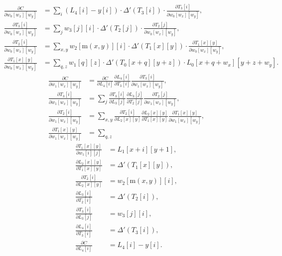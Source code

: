 \documentclass[12pt]{article}
\newcommand{\deriv}[2]{\frac{\partial #1}{\partial #2}}
\newcommand{\m}{\text{m}}
\begin{document}
\begin{align*}
	\deriv{C}{w_0[w_x][w_y]} &= \sum_{i} (L_4[i] - y[i]) \cdot \Delta '(T_3[i]) \cdot \deriv{T_3[i]}{w_0[w_x][w_y]}, \\
	\deriv{T_3[i]}{w_0[w_x][w_y]} &= \sum_{j} w_3[j][i] \cdot \Delta '(T_2[j]) \cdot \deriv{T_2[j]}{w_0[w_x][w_y]}, \\
	\deriv{T_2[i]}{w_0[w_x][w_y]} &= \sum_{x,y} w_2[\m (x,y)][i] \cdot \Delta '(T_1[x][y]) \cdot \deriv{T_1[x][y]}{w_0[w_x][w_y]}, \\
	\deriv{T_1[x][y]}{w_0[w_x][w_y]} &= \sum_{q,z} w_1[q][z] \cdot \Delta '(T_0[x+q][y+z]) \cdot L_0[x+q+w_x][y+z+w_y]. 
\end{align*}
\begin{align*}
	\deriv{C}{w_1[w_x][w_y]} &= \deriv{C}{L_4[i]} \deriv{L_4[i]}{T_3[i]} \deriv{T_3[i]}{w_1[w_x][w_y]}, \\
	\deriv{T_3[i]}{w_1[w_x][w_y]} &= \sum_{j} \deriv{T_3[i]}{L_3[j]} \deriv{L_3[j]}{T_2[j]} \deriv{T_2[j]}{w_1[w_x][w_y]}, \\
	\deriv{T_2[i]}{w_1[w_x][w_y]} &= \sum_{x,y} \deriv{T_2[i]}{L_2[x][y]} \deriv{L_2[x][y]}{T_1[x][y]} \deriv{T_1[x][y]}{w_1[w_x][w_y]}, \\
	\deriv{T_1[x][y]}{w_1[w_x][w_y]} &= \sum_{q,z}
\end{align*}
\begin{align*}
	\deriv{T_1[x][y]}{w_1[i][j]} &= L_1[x+i][y+1], \\
	\deriv{L_2[x][y]}{T_1[x][y]} &= \Delta '(T_1[x][y]), \\
	\deriv{T_2[i]}{L_2[x][y]} &= w_2[\m (x,y)][i], \\
	\deriv{L_3[i]}{T_2[i]} &= \Delta '(T_2[i]), \\
	\deriv{T_3[i]}{L_3[j]} &= w_3[j][i], \\
	\deriv{L_4[i]}{T_3[i]} &= \Delta '(T_3[i]), \\
	\deriv{C}{L_4[i]} &= L_4[i] - y[i].
\end{align*}
\end{document}
